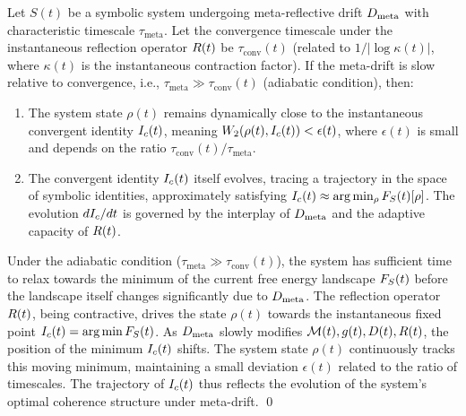 \begin{theorem}
\label{theorem:bk7_relative_convergence_under_meta_drift}
Let \(S(t)\) be a symbolic system undergoing meta-reflective drift \(D_{\mathrm{meta}}\) with characteristic timescale \(\tau_{\mathrm{meta}}\). Let the convergence timescale under the instantaneous reflection operator \(R(t)\) be \(\tau_{\mathrm{conv}}(t)\) (related to \(1/|\log \kappa(t)|\), where \(\kappa(t)\) is the instantaneous contraction factor). If the meta-drift is slow relative to convergence, i.e., \(\tau_{\mathrm{meta}} \gg \tau_{\mathrm{conv}}(t)\) (adiabatic condition), then:
\begin{enumerate}
    \item The system state \(\rho(t)\) remains dynamically close to the instantaneous convergent identity \(I_c(t)\), meaning \(W_2(\rho(t), I_c(t)) < \epsilon(t)\), where \(\epsilon(t)\) is small and depends on the ratio \(\tau_{\mathrm{conv}}(t) / \tau_{\mathrm{meta}}\).
    \item The convergent identity \(I_c(t)\) itself evolves, tracing a trajectory in the space of symbolic identities, approximately satisfying \(I_c(t) \approx \arg\min_{\rho} F_S(t)[\rho]\). The evolution \(dI_c/dt\) is governed by the interplay of \(D_{\mathrm{meta}}\) and the adaptive capacity of \(R(t)\).
\end{enumerate}
\end{theorem}
\begin{demonstratio}
\label{demonstratio:bk7_adiabatic_tracking_reflective_minima}
Under the adiabatic condition (\(\tau_{\mathrm{meta}} \gg \tau_{\mathrm{conv}}(t)\)), the system has sufficient time to relax towards the minimum of the current free energy landscape \(F_S(t)\) before the landscape itself changes significantly due to \(D_{\mathrm{meta}}\). The reflection operator \(R(t)\), being contractive, drives the state \(\rho(t)\) towards the instantaneous fixed point \(I_c(t) = \arg\min F_S(t)\). As \(D_{\mathrm{meta}}\) slowly modifies \(\mathcal{M}(t), g(t), D(t), R(t)\), the position of the minimum \(I_c(t)\) shifts. The system state \(\rho(t)\) continuously tracks this moving minimum, maintaining a small deviation \(\epsilon(t)\) related to the ratio of timescales. The trajectory of \(I_c(t)\) thus reflects the evolution of the system's optimal coherence structure under meta-drift. \qed
\end{demonstratio}
